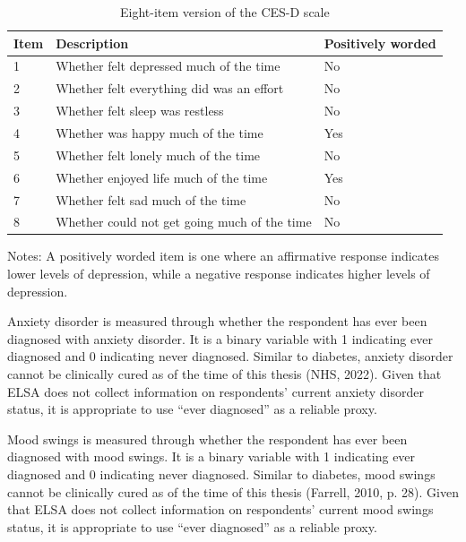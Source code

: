 \begin{table}[h!]
    \centering
    \caption{Eight-item version of the CES-D scale}
    \label{tab:cesd}
    \begin{threeparttable}
        \begin{tabular}{lll}
            \toprule
            Item & Description & Positively worded \\
            \midrule
            1 & Whether felt depressed much of the time & No \\
            2 & Whether felt everything did was an effort & No \\
            3 & Whether felt sleep was restless & No \\
            4 & Whether was happy much of the time & Yes \\
            5 & Whether felt lonely much of the time & No \\
            6 & Whether enjoyed life much of the time & Yes \\
            7 & Whether felt sad much of the time & No \\
            8 & Whether could not get going much of the time & No \\
            \bottomrule
        \end{tabular}
        \begin{tablenotes}
            \footnotesize
            \item Notes: A positively worded item is one where an affirmative response indicates lower levels of depression, while a negative response indicates higher levels of depression.
        \end{tablenotes}
    \end{threeparttable}
\end{table}

Anxiety disorder is measured through whether the respondent has ever been diagnosed with anxiety disorder. It is a binary variable with 1 indicating ever diagnosed and 0 indicating never diagnosed. Similar to diabetes, anxiety disorder cannot be clinically cured as of the time of this thesis (NHS, 2022). Given that ELSA does not collect information on respondents' current anxiety disorder status, it is appropriate to use ``ever diagnosed” as a reliable proxy.

Mood swings is measured through whether the respondent has ever been diagnosed with mood swings. It is a binary variable with 1 indicating ever diagnosed and 0 indicating never diagnosed. Similar to diabetes, mood swings cannot be clinically cured as of the time of this thesis (Farrell, 2010, p. 28). Given that ELSA does not collect information on respondents' current mood swings status, it is appropriate to use ``ever diagnosed” as a reliable proxy.

